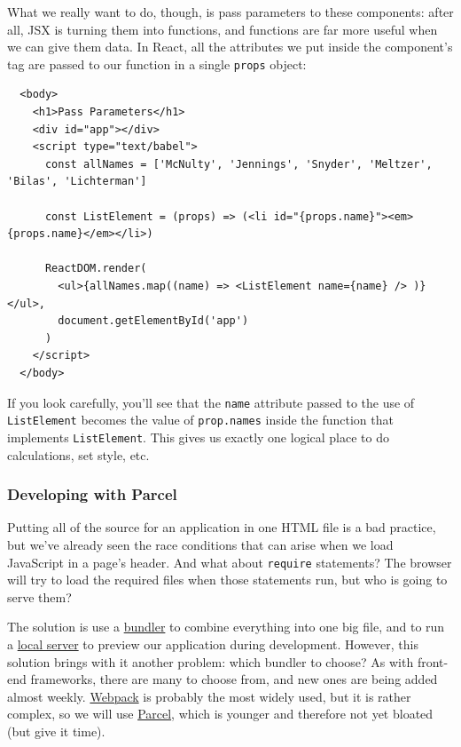 What we really want to do, though, is pass parameters to these
components: after all, JSX is turning them into functions, and functions
are far more useful when we can give them data. In React, all the
attributes we put inside the component's tag are passed to our function
in a single \texttt{props} object:

\begin{verbatim}
  <body>
    <h1>Pass Parameters</h1>
    <div id="app"></div>
    <script type="text/babel">
      const allNames = ['McNulty', 'Jennings', 'Snyder', 'Meltzer', 'Bilas', 'Lichterman']

      const ListElement = (props) => (<li id="{props.name}"><em>{props.name}</em></li>)

      ReactDOM.render(
        <ul>{allNames.map((name) => <ListElement name={name} /> )}</ul>,
        document.getElementById('app')
      )
    </script>
  </body>
\end{verbatim}

If you look carefully, you'll see that the \texttt{name} attribute
passed to the use of \texttt{ListElement} becomes the value of
\texttt{prop.names} inside the function that implements
\texttt{ListElement}. This gives us exactly one logical place to do
calculations, set style, etc.

\subsubsection{Developing with Parcel}\label{s:dynamic-parcel}

Putting all of the source for an application in one HTML file is a bad
practice, but we've already seen the race conditions that can arise when
we load JavaScript in a page's header. And what about \texttt{require}
statements? The browser will try to load the required files when those
statements run, but who is going to serve them?

The solution is use a \protect\hyperlink{g:bundler}{bundler} to combine
everything into one big file, and to run a
\protect\hyperlink{g:local-server}{local server} to preview our
application during development. However, this solution brings with it
another problem: which bundler to choose? As with front-end frameworks,
there are many to choose from, and new ones are being added almost
weekly. \href{https://webpack.js.org/}{Webpack} is probably the most
widely used, but it is rather complex, so we will use
\href{https://parceljs.org/}{Parcel}, which is younger and therefore not
yet bloated (but give it time).


